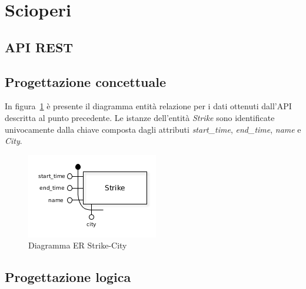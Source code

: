 \section{Scioperi}

\subsection{API REST}

\subsection{Progettazione concettuale}

In figura~\ref{fig:strikes_er} è presente il diagramma entità relazione per i dati
ottenuti dall'API descritta al punto precedente.
Le istanze dell'entità \textit{Strike} sono identificate univocamente dalla chiave composta
dagli attributi \textit{start\_time}, \textit{end\_time}, \textit{name} e \textit{City}.

\begin{figure}                                                                                                                                                            
\centering                                                                                                                                                                   
\includegraphics{diagrams/strikes_er}                                                                                                                                   
\caption{Diagramma ER Strike-City}                                                                                                                                            
\label{fig:strikes_er}                                                                                                                                                           
\end{figure}

\subsection{Progettazione logica}

